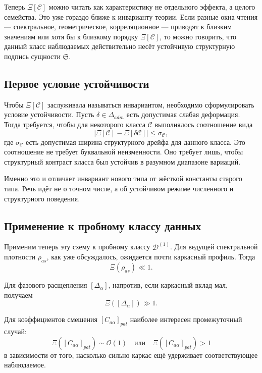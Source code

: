 \documentclass[12pt,a4paper]{article}
\begin{document}
Теперь \(\Xi[\mathcal{C}]\) можно читать как характеристику не отдельного эффекта, а целого семейства. Это уже гораздо ближе к инварианту теории. Если разные окна чтения --- спектральное, геометрическое, корреляционное --- приводят к близким значениям или хотя бы к близкому порядку \(\Xi[\mathcal{C}]\), то можно говорить, что данный класс наблюдаемых действительно несёт устойчивую структурную подпись сущности \(\mathfrak{S}\).

\subsection{Первое условие устойчивости}

Чтобы \(\Xi[\mathcal{C}]\) заслуживала называться инвариантом, необходимо сформулировать условие устойчивости. Пусть \(\delta \in \Delta_{adm}\) есть допустимая слабая деформация. Тогда требуется, чтобы для некоторого класса \(\mathcal{C}\) выполнялось соотношение вида
\begin{equation}
\big| \Xi[\mathcal{C}] - \Xi[\delta \mathcal{C}] \big| \leq \sigma_{\mathcal{C}},
\end{equation}
где \(\sigma_{\mathcal{C}}\) есть допустимая ширина структурного дрейфа для данного класса. Это соотношение не требует буквальной неизменности. Оно требует лишь, чтобы структурный контраст класса был устойчив в разумном диапазоне вариаций.

Именно это и отличает инвариант нового типа от жёсткой константы старого типа. Речь идёт не о точном числе, а об устойчивом режиме численного и структурного поведения.

\subsection{Применение к пробному классу данных}

Применим теперь эту схему к пробному классу \(\mathcal{D}^{(1)}\). Для ведущей спектральной плотности \(\rho_{as}\), как уже обсуждалось, ожидается почти каркасный профиль. Тогда
\begin{equation}
\Xi(\rho_{as}) \ll 1.
\end{equation}

Для фазового расщепления \([\Delta_{\alpha}]\), напротив, если каркасный вклад мал, получаем
\begin{equation}
\Xi([\Delta_{\alpha}]) \gg 1.
\end{equation}

Для коэффициентов смешения \([C_{a\alpha}]_{pat}\) наиболее интересен промежуточный случай:
\begin{equation}
\Xi([C_{a\alpha}]_{pat}) \sim \mathcal{O}(1)
\quad \text{или} \quad
\Xi([C_{a\alpha}]_{pat}) > 1
\end{equation}
в зависимости от того, насколько сильно каркас ещё удерживает соответствующее наблюдаемое.
\end{document}
